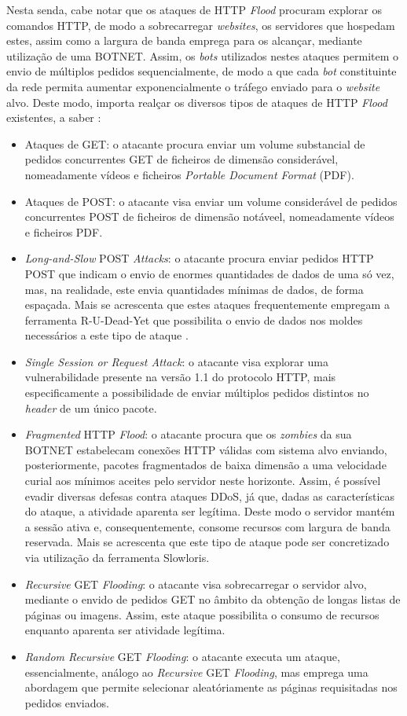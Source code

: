 Nesta senda, cabe notar que os ataques de HTTP \textit{Flood} procuram explorar os comandos HTTP, de modo a sobrecarregar \textit{websites}, os servidores que hospedam estes, assim como a largura de banda emprega para os alcançar, mediante utilização de uma BOTNET. Assim, os \textit{bots} utilizados nestes ataques permitem o envio de múltiplos pedidos sequencialmente, de modo a que cada \textit{bot} constituinte da rede permita aumentar exponencialmente o tráfego enviado para o \textit{website} alvo. Deste modo, importa realçar os diversos tipos de ataques de HTTP \textit{Flood} existentes, a saber \cite{esecurityplanet_types_of_ddos_attacks}:
\begin{itemize}
    \item Ataques de GET: o atacante procura enviar um volume substancial de pedidos concurrentes GET de ficheiros de dimensão considerável, nomeadamente vídeos e ficheiros \textit{Portable Document Format} (PDF).
    \item Ataques de POST: o atacante visa enviar um volume considerável de pedidos concurrentes POST de ficheiros de dimensão notáveel, nomeadamente vídeos e ficheiros PDF.
    \item \textit{Long-and-Slow} POST \textit{Attacks}: o atacante procura enviar pedidos HTTP POST que indicam o envio de enormes quantidades de dados de uma só vez, mas, na realidade, este envia quantidades mínimas de dados, de forma espaçada. Mais se acrescenta que estes ataques frequentemente empregam a ferramenta R-U-Dead-Yet que possibilita o envio de dados nos moldes necessários a este tipo de ataque \cite{what_is_rudy}.
    \item \textit{Single Session or Request Attack}: o atacante visa explorar uma vulnerabilidade presente na versão 1.1 do protocolo HTTP, mais especificamente a possibilidade de enviar múltiplos pedidos distintos no \textit{header} de um único pacote.
    \item \textit{Fragmented} HTTP \textit{Flood}: o atacante procura que os \textit{zombies} da sua BOTNET estabelecam conexões HTTP válidas com sistema alvo enviando, posteriormente, pacotes fragmentados de baixa dimensão a uma velocidade curial aos mínimos aceites pelo servidor neste horizonte. Assim, é possível evadir diversas defesas contra ataques DDoS, já que, dadas as características do ataque, a atividade aparenta ser legítima. Deste modo o servidor mantém a sessão ativa e, consequentemente, consome recursos com largura de banda reservada. Mais se acrescenta que este tipo de ataque pode ser concretizado via utilização da ferramenta Slowloris.
    \item \textit{Recursive} GET \textit{Flooding}: o atacante visa sobrecarregar o servidor alvo, mediante o envido de pedidos GET no âmbito da obtenção de longas listas de páginas ou imagens. Assim, este ataque possibilita o consumo de recursos enquanto aparenta ser atividade legítima.
    \item \textit{Random Recursive} GET \textit{Flooding}: o atacante executa um ataque, essencialmente, análogo ao \textit{Recursive} GET \textit{Flooding}, mas emprega uma abordagem que permite selecionar aleatóriamente as páginas requisitadas nos pedidos enviados.
\end{itemize}


